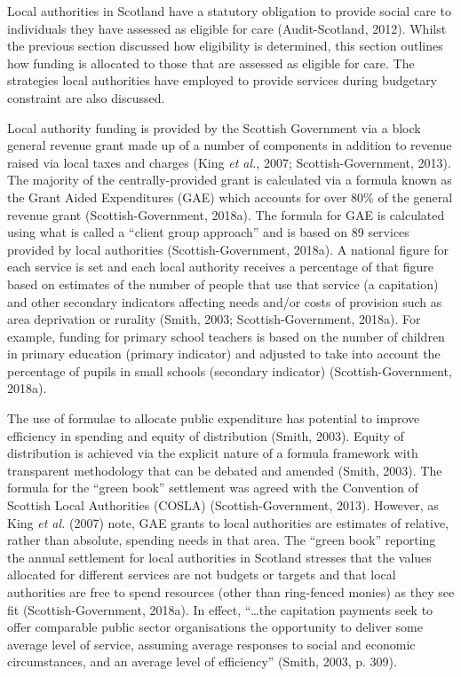 \documentclass[12pt,a4paper,oneside,table]{report}
\begin{document}
Local authorities in Scotland have a statutory obligation to provide
social care to individuals they have assessed as eligible for care
(Audit-Scotland, 2012). Whilst the previous section discussed how
eligibility is determined, this section outlines how funding is
allocated to those that are assessed as eligible for care. The
strategies local authorities have employed to provide services during
budgetary constraint are also discussed.

Local authority funding is provided by the Scottish Government via a
block general revenue grant made up of a number of components in
addition to revenue raised via local taxes and charges (King \emph{et
al.}, 2007; Scottish-Government, 2013). The majority of the
centrally-provided grant is calculated via a formula known as the Grant
Aided Expenditures (GAE) which accounts for over 80\% of the general
revenue grant (Scottish-Government, 2018a). The formula for GAE is
calculated using what is called a ``client group approach'' and is based
on 89 services provided by local authorities (Scottish-Government,
2018a). A national figure for each service is set and each local
authority receives a percentage of that figure based on estimates of the
number of people that use that service (a capitation) and other
secondary indicators affecting needs and/or costs of provision such as
area deprivation or rurality (Smith, 2003; Scottish-Government, 2018a).
For example, funding for primary school teachers is based on the number
of children in primary education (primary indicator) and adjusted to
take into account the percentage of pupils in small schools (secondary
indicator) (Scottish-Government, 2018a).

The use of formulae to allocate public expenditure has potential to
improve efficiency in spending and equity of distribution (Smith, 2003).
Equity of distribution is achieved via the explicit nature of a formula
framework with transparent methodology that can be debated and amended
(Smith, 2003). The formula for the ``green book'' settlement was agreed
with the Convention of Scottish Local Authorities (COSLA)
(Scottish-Government, 2013). However, as King \textit{et al.} (2007)
note, GAE grants to local authorities are estimates of relative, rather
than absolute, spending needs in that area. The ``green book'' reporting
the annual settlement for local authorities in Scotland stresses that
the values allocated for different services are not budgets or targets
and that local authorities are free to spend resources (other than
ring-fenced monies) as they see fit (Scottish-Government, 2018a). In
effect, ``\ldots the capitation payments seek to offer comparable public
sector organisations the opportunity to deliver some average level of
service, assuming average responses to social and economic
circumstances, and an average level of efficiency'' (Smith, 2003, p.
309).
\end{document}
